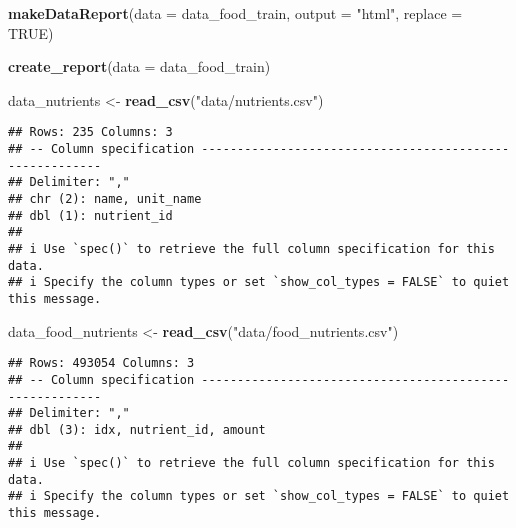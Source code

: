 \documentclass[
]{article}
\newenvironment{Shaded}{\begin{snugshade}}{\end{snugshade}}
\newcommand{\AttributeTok}[1]{\textcolor[rgb]{0.13,0.29,0.53}{#1}}
\newcommand{\ConstantTok}[1]{\textcolor[rgb]{0.56,0.35,0.01}{#1}}
\newcommand{\FunctionTok}[1]{\textcolor[rgb]{0.13,0.29,0.53}{\textbf{#1}}}
\newcommand{\NormalTok}[1]{#1}
\newcommand{\OtherTok}[1]{\textcolor[rgb]{0.56,0.35,0.01}{#1}}
\newcommand{\StringTok}[1]{\textcolor[rgb]{0.31,0.60,0.02}{#1}}
\begin{document}
\begin{Shaded}
\begin{Highlighting}[]
\FunctionTok{makeDataReport}\NormalTok{(}\AttributeTok{data =}\NormalTok{ data\_food\_train, }\AttributeTok{output =} \StringTok{"html"}\NormalTok{, }\AttributeTok{replace =} \ConstantTok{TRUE}\NormalTok{)}
\end{Highlighting}
\end{Shaded}

\begin{Shaded}
\begin{Highlighting}[]
\FunctionTok{create\_report}\NormalTok{(}\AttributeTok{data =}\NormalTok{ data\_food\_train)}
\end{Highlighting}
\end{Shaded}

\begin{Shaded}
\begin{Highlighting}[]
\NormalTok{data\_nutrients }\OtherTok{\textless{}{-}} \FunctionTok{read\_csv}\NormalTok{(}\StringTok{"data/nutrients.csv"}\NormalTok{)}
\end{Highlighting}
\end{Shaded}

\begin{verbatim}
## Rows: 235 Columns: 3
## -- Column specification --------------------------------------------------------
## Delimiter: ","
## chr (2): name, unit_name
## dbl (1): nutrient_id
## 
## i Use `spec()` to retrieve the full column specification for this data.
## i Specify the column types or set `show_col_types = FALSE` to quiet this message.
\end{verbatim}

\begin{Shaded}
\begin{Highlighting}[]
\NormalTok{data\_food\_nutrients }\OtherTok{\textless{}{-}} \FunctionTok{read\_csv}\NormalTok{(}\StringTok{"data/food\_nutrients.csv"}\NormalTok{)}
\end{Highlighting}
\end{Shaded}

\begin{verbatim}
## Rows: 493054 Columns: 3
## -- Column specification --------------------------------------------------------
## Delimiter: ","
## dbl (3): idx, nutrient_id, amount
## 
## i Use `spec()` to retrieve the full column specification for this data.
## i Specify the column types or set `show_col_types = FALSE` to quiet this message.
\end{verbatim}
\end{document}
